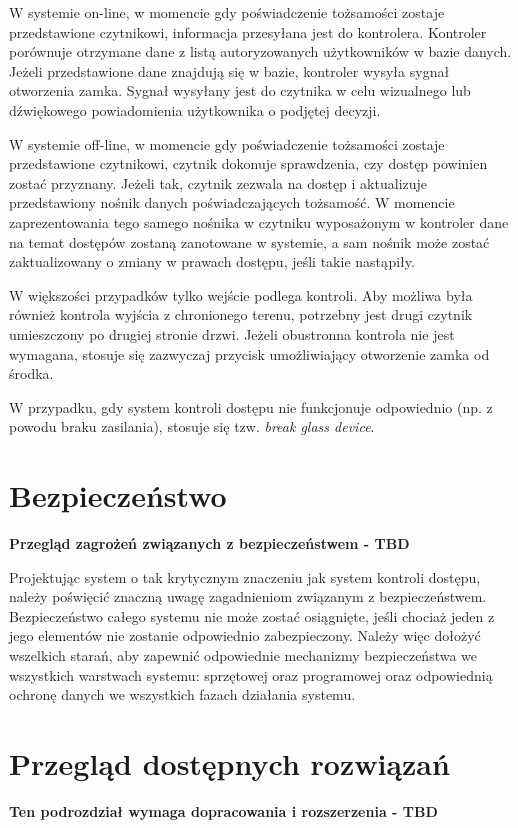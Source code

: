 		W systemie on-line, w momencie gdy poświadczenie tożsamości zostaje przedstawione czytnikowi, informacja przesyłana jest do kontrolera. Kontroler porównuje otrzymane dane z listą autoryzowanych użytkowników w bazie danych. Jeżeli przedstawione dane znajdują się w bazie, kontroler wysyła sygnał otworzenia zamka. Sygnał wysyłany jest do czytnika w celu wizualnego lub dźwiękowego powiadomienia użytkownika o podjętej decyzji.~\cite{bsia2016}

		W systemie off-line, w momencie gdy poświadczenie tożsamości zostaje przedstawione czytnikowi, czytnik dokonuje sprawdzenia, czy dostęp powinien zostać przyznany. Jeżeli tak, czytnik zezwala na dostęp i aktualizuje przedstawiony nośnik danych poświadczających tożsamość. W momencie zaprezentowania tego samego nośnika w czytniku wyposażonym w kontroler dane na temat dostępów zostaną zanotowane w systemie, a sam nośnik może zostać zaktualizowany o zmiany w prawach dostępu, jeśli takie nastąpiły.~\cite{bsia2016}

		W większości przypadków tylko wejście podlega kontroli. Aby możliwa była również kontrola wyjścia z chronionego terenu, potrzebny jest drugi czytnik umieszczony po drugiej stronie drzwi. Jeżeli obustronna kontrola nie jest wymagana, stosuje się zazwyczaj przycisk umożliwiający otworzenie zamka od środka.~\cite{bsia2016}

		W przypadku, gdy system kontroli dostępu nie funkcjonuje odpowiednio (np. z powodu braku zasilania), stosuje się tzw. \textit{break glass device}.~\cite{bsia2016}

	\section{Bezpieczeństwo}
		\textbf{Przegląd zagrożeń związanych z bezpieczeństwem - TBD}

		Projektując system o tak krytycznym znaczeniu jak system kontroli dostępu, należy poświęcić znaczną uwagę zagadnieniom związanym z bezpieczeństwem. Bezpieczeństwo całego systemu nie może zostać osiągnięte, jeśli chociaż jeden z jego elementów nie zostanie odpowiednio zabezpieczony. Należy więc dołożyć wszelkich starań, aby zapewnić odpowiednie mechanizmy bezpieczeństwa we wszystkich warstwach systemu: sprzętowej oraz programowej oraz odpowiednią ochronę danych we wszystkich fazach działania systemu.

	\section{Przegląd dostępnych rozwiązań}
		\textbf{Ten podrozdział wymaga dopracowania i rozszerzenia - TBD}

